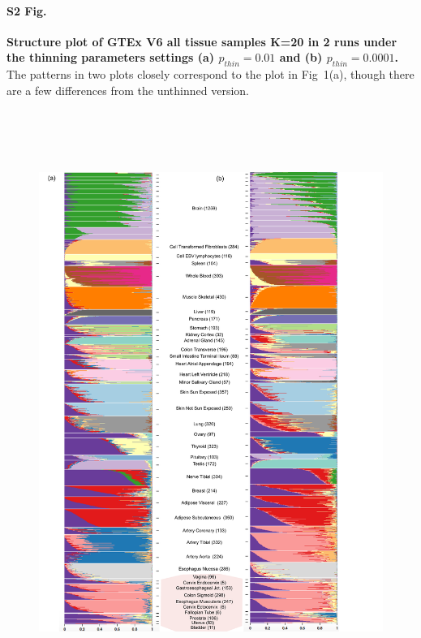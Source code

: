 \documentclass[10pt,letterpaper]{article}
\begin{document}
\paragraph*{S2 Fig.}
\label{figS1}
{\bf Structure plot of GTEx V6 all tissue samples K=20 in 2 runs under the thinning parameters settings (a) $p_{thin}=0.01$ and (b) $p_{thin}=0.0001$.} The patterns in two plots closely correspond to the plot in Fig~1(a), though there are a few differences from the unthinned version.
\begin{figure}[ht]
\centering
\includegraphics[height=7.5in, width=6.5in]{../../plots/gtex-figures/gtex_thinned_04_25_2016.pdf}
\end{figure}
\clearpage
\end{document}
